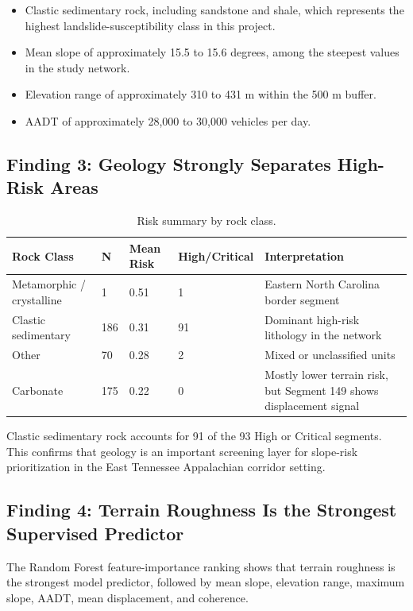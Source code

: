 \documentclass[11pt,letterpaper]{article}
\begin{document}
\begin{itemize}
  \item Clastic sedimentary rock, including sandstone and shale, which represents the highest landslide-susceptibility class in this project.
  \item Mean slope of approximately 15.5 to 15.6 degrees, among the steepest values in the study network.
  \item Elevation range of approximately 310 to 431 m within the 500 m buffer.
  \item AADT of approximately 28,000 to 30,000 vehicles per day.
\end{itemize}

\subsection{Finding 3: Geology Strongly Separates High-Risk Areas}

\begin{table}[H]
\centering
\caption{Risk summary by rock class.}
\label{tab:geology}
\begin{tabularx}{\linewidth}{Y C{1.6cm}C{2.2cm}C{2.3cm}Y}
\toprule
\textbf{Rock Class} &
\textbf{N} &
\textbf{Mean Risk} &
\textbf{High/Critical} &
\textbf{Interpretation} \\
\midrule
Metamorphic / crystalline & 1 & 0.51 & 1 & Eastern North Carolina border segment \\
Clastic sedimentary & 186 & 0.31 & 91 & Dominant high-risk lithology in the network \\
Other & 70 & 0.28 & 2 & Mixed or unclassified units \\
Carbonate & 175 & 0.22 & 0 & Mostly lower terrain risk, but Segment 149 shows displacement signal \\
\bottomrule
\end{tabularx}
\end{table}

Clastic sedimentary rock accounts for 91 of the 93 High or Critical segments. This confirms that geology is an important screening layer for slope-risk prioritization in the East Tennessee Appalachian corridor setting.

\subsection{Finding 4: Terrain Roughness Is the Strongest Supervised Predictor}

The Random Forest feature-importance ranking shows that terrain roughness is the strongest model predictor, followed by mean slope, elevation range, maximum slope, AADT, mean displacement, and coherence.
\end{document}
